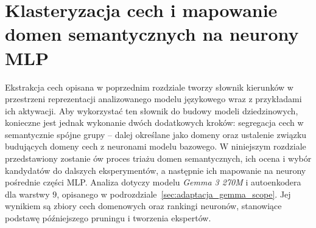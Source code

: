 



\chapter{Klasteryzacja cech i mapowanie domen semantycznych na neurony MLP}
\label{chap:klasteryzacja}
Ekstrakcja cech opisana w poprzednim rozdziale tworzy słownik kierunków w przestrzeni reprezentacji analizowanego modelu językowego wraz z przykładami ich aktywacji. Aby wykorzystać ten słownik do budowy modeli dziedzinowych, konieczne jest jednak wykonanie dwóch dodatkowych kroków: segregacja cech w semantycznie spójne grupy -- dalej określane jako domeny oraz ustalenie związku budujących domeny cech z neuronami modelu bazowego. W niniejszym rozdziale przedstawiony zostanie ów proces triażu domen semantycznych, ich ocena i wybór kandydatów do dalszych eksperymentów, a następnie ich mapowanie na neurony pośrednie części MLP. Analiza dotyczy modelu \textit{Gemma 3 270M} i autoenkodera dla warstwy $9$, opisanego w podrozdziale~\ref{sec:adaptacja_gemma_scope}. Jej wynikiem są zbiory cech domenowych oraz rankingi neuronów, stanowiące podstawę późniejszego pruningu i tworzenia ekspertów. 

